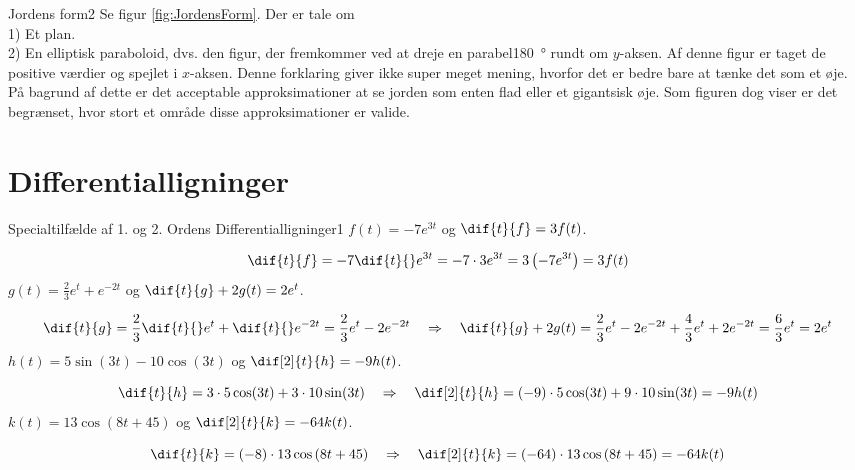 \begin{opgave}{Jordens form}{2}
\opg Se figur \ref{fig:JordensForm}.
\opg Der er tale om \\
1) \enspace Et plan. \\
2) \enspace En elliptisk paraboloid, dvs. den figur, der fremkommer ved at dreje en parabel\SI{180}{\degree} rundt om $y$-aksen. Af denne figur er taget de positive værdier og spejlet i $x$-aksen. Denne forklaring giver ikke super meget mening, hvorfor det er bedre bare at tænke det som et øje.
\opg På bagrund af dette er det acceptable approksimationer at se jorden som enten flad eller et gigantsisk øje. Som figuren dog viser er det begrænset, hvor stort et område disse approksimationer er valide.
\end{opgave}

\newpage

\section*{Differentialligninger}

\begin{opgave}{Specialtilfælde af 1. og 2. Ordens Differentialligninger}{1}
\opg $f(t) = -7e^{3t}$ og $\dif{t}{f} = 3f(t)$.

$$\dif{t}{f} = -7 \dif{t}{} e^{3t} = -7 \cdot 3 e^{3t} = 3 \left( -7 e^{3t} \right) = 3 f(t)$$
\vspace{2mm}
\opg $g(t) = \frac{2}{3}e^t + e^{-2t}$ og $\dif{t}{g} + 2g(t) = 2e^t$.

$$\dif{t}{g} = \frac{2}{3} \dif{t}{}e^t + \dif{t}{} e^{-2t} = \frac{2}{3}e^t -2e^{-2t} \quad \Rightarrow \quad \dif{t}{g} + 2g(t) = \frac{2}{3}e^t -2e^{-2t} + \frac{4}{3}e^t + 2e^{-2t} = \frac{6}{3} e^t = 2e^t$$
\vspace{2mm}
\opg $h(t) = 5 \sin(3t) - 10\cos(3t)$ og $\dif[2]{t}{h} = -9h(t)$.

$$\dif{t}{h} = 3 \cdot 5 \cos(3t) + 3 \cdot 10 \sin(3t) \quad \Rightarrow \quad \dif[2]{t}{h} = (-9) \cdot 5 \cos(3t) + 9 \cdot 10 \sin(3t) = -9 h(t)$$
\vspace{2mm}
\opg $k(t) = 13 \cos \left( 8t + 45 \right)$ og $\dif[2]{t}{k} = -64 k(t)$.

$$\dif{t}{k} = (-8) \cdot 13 \cos \left( 8t + 45 \right) \quad \Rightarrow \quad \dif[2]{t}{k} = (-64) \cdot 13 \cos \left( 8t + 45 \right) = -64 k(t)$$
\vspace{2mm}
\end{opgave}

